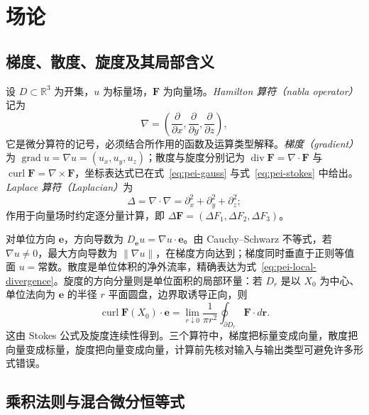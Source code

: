 \section{场论}
\label{sec:pei-vector-fields}

\subsection{梯度、散度、旋度及其局部含义}

设 $D\subset\mathbb R^3$ 为开集，$u$ 为标量场，$\boldsymbol F$ 为向量场。\emph{Hamilton 算符（nabla operator）}记为
\[
\nabla=\left(\frac\partial{\partial x},\frac\partial{\partial y},\frac\partial{\partial z}\right),
\]
它是微分算符的记号，必须结合所作用的函数及运算类型解释。\emph{梯度（gradient）}为 $\operatorname{grad}u=\nabla u=(u_x,u_y,u_z)$；散度与旋度分别记为 $\operatorname{div}\boldsymbol F=\nabla\cdot\boldsymbol F$ 与 $\operatorname{curl}\boldsymbol F=\nabla\times\boldsymbol F$，坐标表达式已在式~\eqref{eq:pei-gauss} 与式~\eqref{eq:pei-stokes} 中给出。\emph{Laplace 算符（Laplacian）}为
\[
\Delta=\nabla\cdot\nabla=\partial_x^2+\partial_y^2+\partial_z^2;
\]
作用于向量场时约定逐分量计算，即 $\Delta\boldsymbol F=(\Delta F_1,\Delta F_2,\Delta F_3)$。

对单位方向 $\boldsymbol e$，方向导数为 $D_{\boldsymbol e}u=\nabla u\cdot\boldsymbol e$。由 Cauchy--Schwarz 不等式，若 $\nabla u\ne0$，最大方向导数为 $\|\nabla u\|$，在梯度方向达到；梯度同时垂直于正则等值面 $u=\text{常数}$。散度是单位体积的净外流率，精确表达为式~\eqref{eq:pei-local-divergence}。旋度的方向分量则是单位面积的局部环量：若 $D_r$ 是以 $X_0$ 为中心、单位法向为 $\boldsymbol e$ 的半径 $r$ 平面圆盘，边界取诱导正向，则
\[
\operatorname{curl}\boldsymbol F(X_0)\cdot\boldsymbol e
=\lim_{r\downarrow0}\frac1{\pi r^2}
\oint_{\partial D_r}\boldsymbol F\cdot d\boldsymbol r.
\]
这由 Stokes 公式及旋度连续性得到。三个算符中，梯度把标量变成向量，散度把向量变成标量，旋度把向量变成向量，计算前先核对输入与输出类型可避免许多形式错误。

\subsection{乘积法则与混合微分恒等式}

